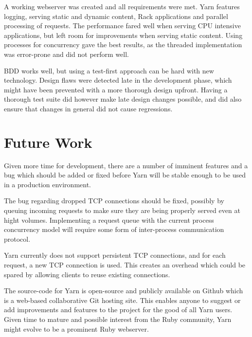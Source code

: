 A working webserver was created and all requirements were met. Yarn features
logging, serving static and dynamic content, Rack applications and parallel
processing of requests.
The performance fared well when serving CPU intensive applications, but left
room for improvements when serving static content.
Using processes for concurrency gave the best results, as the threaded
implementation was error-prone and did not perform well.

BDD works well, but using a test-first approach can be hard with new
technology. Design flaws were detected late in the development phase, which
might have been prevented with a more thorough design upfront. Having a
thorough test suite did however make late design changes possible, and did
also ensure that changes in general did not cause regressions.

\section{Future Work}
Given more time for development, there are a number of imminent features and
a bug which should be added or fixed before Yarn will be stable enough to be
used in a production environment.

The bug regarding dropped TCP connections should be fixed, possibly by
queuing incoming requests to make sure they are being properly served
even at hight volumes. Implementing a request queue with the current process
concurrency model will require some form of inter-process communication
protocol.

Yarn currently does not support persistent TCP connections, and for each
request, a new TCP connection is used. This creates an overhead which could be
spared by allowing clients to reuse existing connections.

The source-code for Yarn is open-source and publicly available on Github which
is a web-based collaborative Git hosting site. This enables anyone to suggest
or add improvements and features to the project for the good of all Yarn
users. Given time to mature and possible interest from the Ruby community,
Yarn might evolve to be a prominent Ruby webserver.
